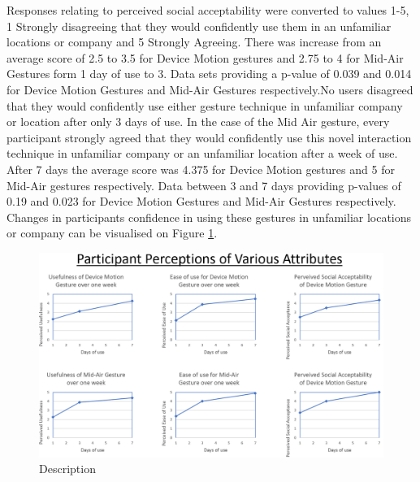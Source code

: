 \documentclass{l4proj}
\begin{document}
Responses relating to perceived social acceptability were converted to values 1-5, 1 Strongly disagreeing that they would confidently use them in an unfamiliar locations or company and 5 Strongly Agreeing. There was increase from an average score of 2.5 to 3.5 for Device Motion gestures and 2.75 to 4 for Mid-Air Gestures form 1 day of use to 3. Data sets providing a p-value of 0.039 and 0.014 for Device Motion Gestures and Mid-Air Gestures respectively.No users disagreed that they would confidently use either gesture technique in unfamiliar company or location after only 3 days of use.  In the case of the Mid Air gesture, every participant strongly agreed that they would confidently use this novel interaction technique in unfamiliar company or an unfamiliar location after a week of use. After 7 days the average score was 4.375 for Device Motion gestures and 5 for Mid-Air gestures respectively. Data between 3 and 7 days providing p-values of 0.19 and 0.023 for Device Motion Gestures and Mid-Air Gestures respectively. Changes in participants confidence in using these gestures in unfamiliar locations or company can be visualised on Figure \ref{fig:perceptions}.

\begin{figure}[!htb]
    \centering
    \includegraphics[width=\textwidth]{images/perceptions.PNG}
        \caption{Description}
        \label{fig:perceptions}
\end{figure}
\end{document}
